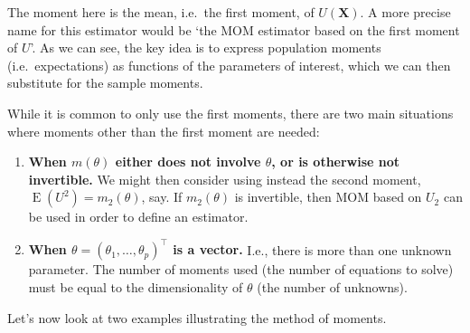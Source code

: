 \documentclass[
]{book}
\newcommand{\bX}{{\boldsymbol X}}
\DeclareMathOperator{\E}{E}
\theoremstyle{definition}
\theoremstyle{definition}
\theoremstyle{definition}
\theoremstyle{definition}
\theoremstyle{remark}
\begin{document}
The moment here is the mean, i.e.~the first moment, of \(U(\bX)\).
A more precise name for this estimator would be `the MOM estimator based on the first moment of \(U\)'.
As we can see, the key idea is to express population moments (i.e.~expectations) as functions of the parameters of interest, which we can then substitute for the sample moments.

While it is common to only use the first moments, there are two main situations where moments other than the first moment are needed:

\begin{enumerate}
\def\labelenumi{\arabic{enumi}.}
\item
  \textbf{When \(m(\theta)\) either does not involve \(\theta\), or is otherwise not invertible.} We might then consider using instead the second moment, \(\E(U^2) = m_2(\theta)\), say. If \(m_2(\theta)\) is invertible, then MOM based on \(U_2\) can be used in order to define an estimator.
\item
  \textbf{When \(\theta=(\theta_1,\dots,\theta_p)^\top\) is a vector.} I.e., there is more than one unknown parameter. The number of moments used (the number of equations to solve) must be equal to the dimensionality of \(\theta\) (the number of unknowns).
\end{enumerate}

Let's now look at two examples illustrating the method of moments.
\end{document}
